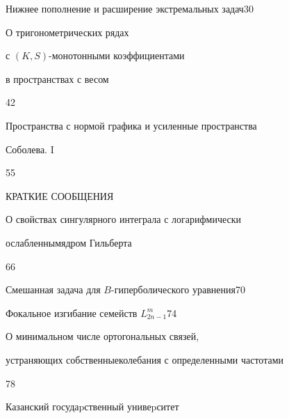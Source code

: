 

{Нижнее пополнение и расширение экстремальных задач}{30}




{О тригонометрических рядах


с $(K,S)$-монотонными коэффициентами\newline


в пространствах с весом}{42}




{Пространства с нормой графика и усиленные пространства


Соболева. I}{55}










\bigskip


\begin{center}


КРАТКИЕ СООБЩЕНИЯ


\end{center}


\bigskip







{О свойствах сингулярного интеграла с логарифмически


ослабленным\newline ядром Гильберта}{66}




{Смешанная задача для $B$-гиперболического уравнения}{70}




{Фокальное изгибание семейств $L^m_{2n-1}$}{74}




{О минимальном числе ортогональных связей,


устраняющих собственные\newline колебания с определенными частотами}{78}














\vfill


\noindent\raisebox{2pt}{\copyright} Казанский госудаpственный унивеpситет





